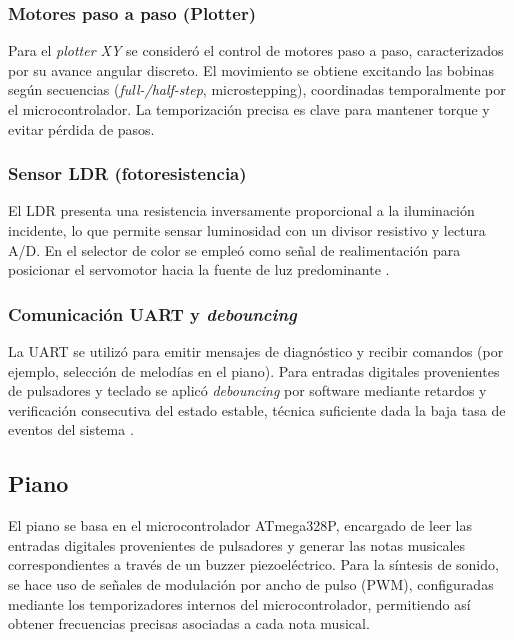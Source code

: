 \subsubsection{Motores paso a paso (Plotter)}

Para el \textit{plotter XY} se consideró el control de motores paso a paso, caracterizados por su avance angular discreto. El movimiento se obtiene excitando las bobinas según secuencias (\textit{full-/half-step}, microstepping), coordinadas temporalmente por el microcontrolador. La temporización precisa es clave para mantener torque y evitar pérdida de pasos.

\subsubsection{Sensor LDR (fotoresistencia)}

El LDR presenta una resistencia inversamente proporcional a la iluminación incidente, lo que permite sensar luminosidad con un divisor resistivo y lectura A/D. En el selector de color se empleó como señal de realimentación para posicionar el servomotor hacia la fuente de luz predominante \cite{ldr_datasheet}.

\subsubsection{Comunicación UART y \textit{debouncing}}

La UART se utilizó para emitir mensajes de diagnóstico y recibir comandos (por ejemplo, selección de melodías en el piano). Para entradas digitales provenientes de pulsadores y teclado se aplicó \textit{debouncing} por software mediante retardos y verificación consecutiva del estado estable, técnica suficiente dada la baja tasa de eventos del sistema \cite{atmega328p_datasheet}.


\subsection{Piano}

El piano se basa en el microcontrolador ATmega328P, encargado de leer las entradas digitales provenientes de pulsadores y generar las notas musicales correspondientes a través de un buzzer piezoeléctrico. 
Para la síntesis de sonido, se hace uso de señales de modulación por ancho de pulso (PWM), configuradas mediante los temporizadores internos del microcontrolador, permitiendo así obtener frecuencias precisas asociadas a cada nota musical.

